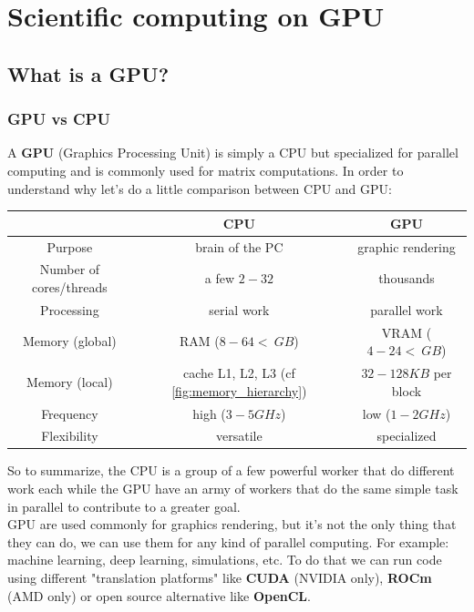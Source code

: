\documentclass[12pt, openany]{report}
\theoremstyle{definition}
\begin{document}
\chapter{Scientific computing on GPU}
\section{What is a GPU?}
\subsection{GPU vs CPU}
A \textbf{GPU} (Graphics Processing Unit) is simply a CPU but specialized for parallel computing and is commonly used for matrix computations. In order to understand why let's do a little comparison between CPU and GPU:
\begin{center}
	\begin{tabular}{|c|c|c|}
		\hline
		& CPU & GPU \\
		\hline
		Purpose & brain of the PC & graphic rendering \\
		\hline
		Number of cores/threads & a few $2-32$ & thousands \\
		\hline
		Processing & serial work & parallel work \\
		\hline
		Memory (global) & RAM ($8-64< \: GB$) & VRAM ($4-24< \: GB$) \\
		\hline
		Memory (local) & cache L1, L2, L3 (cf \ref{fig:memory_hierarchy}) & $32-128 KB$ per block \\
		\hline
		Frequency & high ($3-5 GHz$) & low ($1-2 GHz$) \\
		\hline
		Flexibility & versatile & specialized \\
		\hline
	\end{tabular}
\end{center}
So to summarize, the CPU is a group of a few powerful worker that do different work each while the GPU have an army of workers that do the same simple task in parallel to contribute to a greater goal.\\
GPU are used commonly for graphics rendering, but it's not the only thing that they can do, we can use them for any kind of parallel computing. For example: machine learning, deep learning, simulations, etc. To do that we can run code using different "translation platforms" like \textbf{CUDA} (NVIDIA only), \textbf{ROCm} (AMD only) or open source alternative like \textbf{OpenCL}.\\
\newpage
\end{document}
